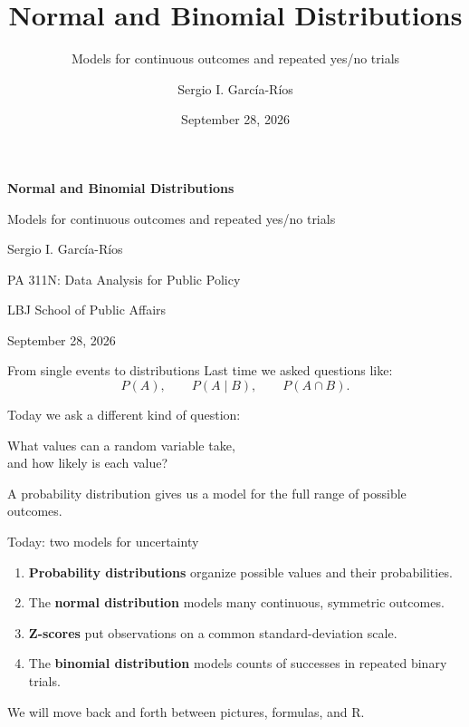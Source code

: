 \documentclass[11pt,aspectratio=169]{beamer}
\author{Sergio I. Garc\'ia-R\'ios}
\title{Normal and Binomial Distributions}
\subtitle{Models for continuous outcomes and repeated yes/no trials}
\institute{PA 311N: Data Analysis for Public Policy\\LBJ School of Public Affairs}
\date{September 28, 2026}
\begin{document}
\begin{frame}[plain]
\centering
\vspace{0.7cm}
{\color{LBJnavy}\LARGE\bfseries Normal and Binomial Distributions\par}
\vspace{0.45cm}
{\large Models for continuous outcomes and repeated yes/no trials\par}
\vspace{1.0cm}
{\normalsize Sergio I. Garc\'ia-R\'ios\par}
\vspace{0.2cm}
{\small PA 311N: Data Analysis for Public Policy\par}
{\small LBJ School of Public Affairs\par}
\vfill
{\small September 28, 2026\par}
\end{frame}

\begin{frame}{From single events to distributions}
Last time we asked questions like:
\[
P(A), \qquad P(A\mid B), \qquad P(A\cap B).
\]

Today we ask a different kind of question:

\begin{center}
\Large What values can a \alert{random variable} take,\\and how likely is each value?
\end{center}

\vfill
A probability distribution gives us a model for the full range of possible outcomes.
\end{frame}

\begin{frame}{Today: two models for uncertainty}
\begin{enumerate}
  \item \textbf{Probability distributions} organize possible values and their probabilities.
  \item The \textbf{normal distribution} models many continuous, symmetric outcomes.
  \item \textbf{Z-scores} put observations on a common standard-deviation scale.
  \item The \textbf{binomial distribution} models counts of successes in repeated binary trials.
\end{enumerate}

\vfill
We will move back and forth between \alert{pictures}, \alert{formulas}, and \alert{R}.
\end{frame}
\end{document}

